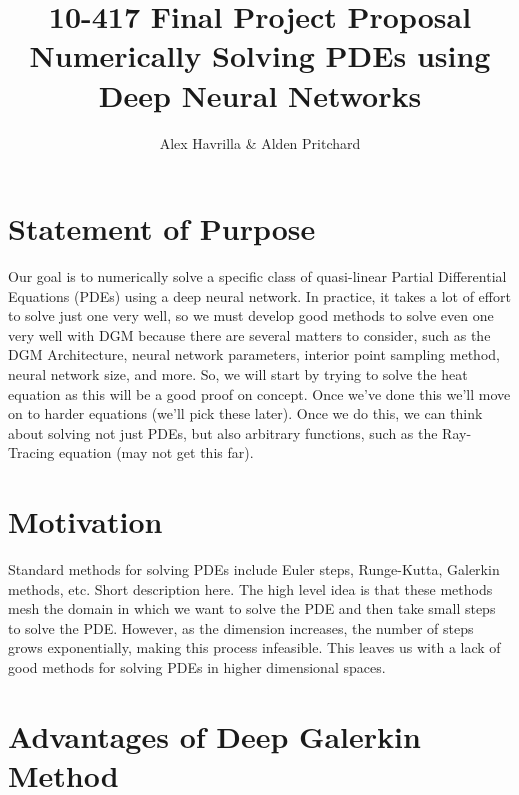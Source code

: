 \documentclass[14pt]{article}
\title{\textbf{10-417 Final Project Proposal}
\\{\Large Numerically Solving PDEs using Deep Neural Networks}}
\author{Alex Havrilla \& Alden Pritchard}
\begin{document}
\maketitle


\section{ Statement of Purpose }

Our goal is to numerically solve a specific class of quasi-linear Partial Differential Equations (PDEs) using a deep neural network. In practice, it takes a lot of effort to solve just one very well, so we must develop good methods to solve even one very well with DGM because there are several matters to consider, such as the DGM Architecture, neural network parameters, interior point sampling method, neural network size, and more. 
So, we will start by trying to solve the heat equation as this will be a good proof on concept. Once we’ve done this we’ll move on to harder equations (we’ll pick these later). Once we do this, we can think about solving not just PDEs, but also arbitrary functions, such as the Ray-Tracing equation (may not get this far).

\section{ Motivation }

Standard methods for solving PDEs include Euler steps, Runge-Kutta, Galerkin methods, etc. Short description here. The high level idea is that these methods mesh the domain in which we want to solve the PDE and then take small steps to solve the PDE. However, as the dimension increases, the number of steps grows exponentially, making this process infeasible. This leaves us with a lack of good methods for solving PDEs in higher dimensional spaces.

\section{ Advantages of Deep Galerkin Method }
\end{document}
